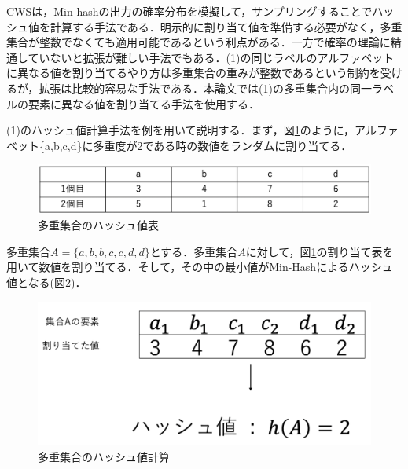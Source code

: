 CWSは，Min-hashの出力の確率分布を模擬して，サンプリングすることでハッシュ値を計算する手法である．明示的に割り当て値を準備する必要がなく，多重集合が整数でなくても適用可能であるという利点がある．一方で確率の理論に精通していないと拡張が難しい手法でもある．(1)の同じラベルのアルファベットに異なる値を割り当てるやり方は多重集合の重みが整数であるという制約を受けるが，拡張は比較的容易な手法である．本論文では(1)の多重集合内の同一ラベルの要素に異なる値を割り当てる手法を使用する．

 

(1)のハッシュ値計算手法を例を用いて説明する．まず，図\ref{fig:2wariate}のように，アルファベット\{a,b,c,d\}に多重度が2である時の数値をランダムに割り当てる．
\begin{figure}[H]
  \centering
  \includegraphics[width=15cm]{multi22.png}
  \caption{多重集合のハッシュ値表}
  \label{fig:2wariate}
\end{figure}

多重集合$A =\{a,b,b,c,c,d,d\}$とする．多重集合$A$に対して，図\ref{fig:2wariate}の割り当て表を用いて数値を割り当てる．そして，その中の最小値がMin-Hashによるハッシュ値となる(図\ref{fig:255})．

\begin{figure}[H]
  \centering
  \includegraphics[width=15cm]{255.png}
  \caption{多重集合のハッシュ値計算}
  \label{fig:255}
\end{figure}

